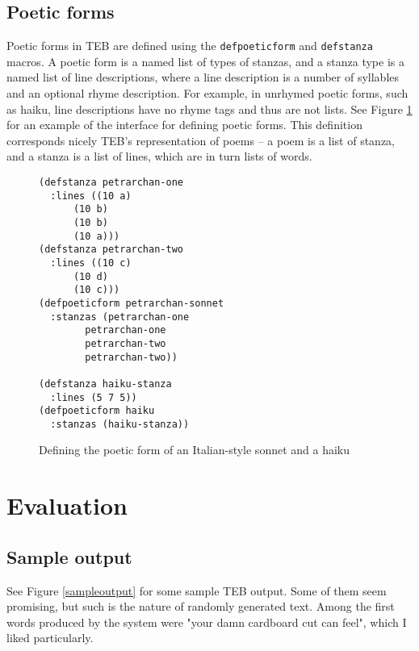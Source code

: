 \documentclass[12pt]{article}
\begin{document}
\subsection{Poetic forms}
\label{forms}
Poetic forms in TEB are defined using the \verb+defpoeticform+ and
\verb+defstanza+ macros. A poetic form is a named list of types of
stanzas, and a stanza type is a named list of line descriptions, where a
line description is a number of syllables and an optional rhyme
description. For example, in unrhymed poetic forms, such as haiku, line
descriptions have no rhyme tags and thus are not lists. See Figure
\ref{defpoeticform} for an example of the interface for defining poetic
forms. This definition corresponds nicely TEB's representation of poems
-- a poem is a list of stanza, and a stanza is a list of lines, which are
in turn lists of words.

\begin{figure}
\begin{center}
\begin{verbatim}
(defstanza petrarchan-one
  :lines ((10 a)
	  (10 b)
	  (10 b)
	  (10 a)))
(defstanza petrarchan-two
  :lines ((10 c)
	  (10 d)
	  (10 c)))
(defpoeticform petrarchan-sonnet
  :stanzas (petrarchan-one
	    petrarchan-one
	    petrarchan-two
	    petrarchan-two))

(defstanza haiku-stanza
  :lines (5 7 5))
(defpoeticform haiku
  :stanzas (haiku-stanza))
\end{verbatim}
\caption{Defining the poetic form of an Italian-style sonnet and a haiku}
\label{defpoeticform}
\end{center}
\end{figure}

\section{Evaluation}
\subsection{Sample output}
See Figure \ref{sampleoutput} for some sample TEB output. Some of them seem
promising, but such is the nature of randomly generated text. Among the first
words produced by the system were "your damn cardboard cut can feel", which
I liked particularly.
\end{document}
